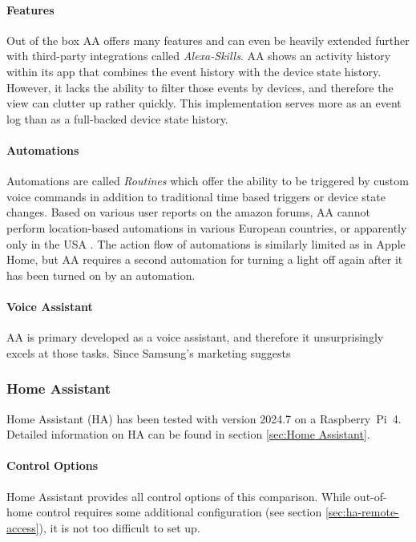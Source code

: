 \paragraph{Features}
Out of the box AA offers many features and can even be heavily extended further with third-party integrations called \textit{Alexa-Skills}.
AA shows an activity history within its app that combines the event history with the device state history. However, it lacks the ability to filter those events by devices, and therefore the view can clutter up rather quickly. This implementation serves more as an event log than as a full-backed device state history.


\paragraph{Automations}
Automations are called \textit{Routines} which offer the ability to be triggered by custom voice commands in addition to traditional time based triggers or device state changes.
Based on various user reports on the amazon forums, AA cannot perform location-based automations in various European countries, or apparently only in the USA \cite{Amazon_Forum2022LocationTrigger}.
The action flow of automations is similarly limited as in Apple Home, but AA requires a second automation for turning a light off again after it has been turned on by an automation.

\paragraph{Voice Assistant}
AA is primary developed as a voice assistant, and therefore it unsurprisingly excels at those tasks. Since Samsung's marketing suggests

\newpage
\subsubsection{Home Assistant}
Home Assistant (HA) has been tested with version 2024.7 on a Raspberry~Pi~4. Detailed information on HA can be found in section \ref{sec:Home Assistant}.

\paragraph{Control Options}
Home Assistant provides all control options of this comparison. While out-of-home control requires some additional configuration (see section \ref{sec:ha-remote-access}), it is not too difficult to set up.

